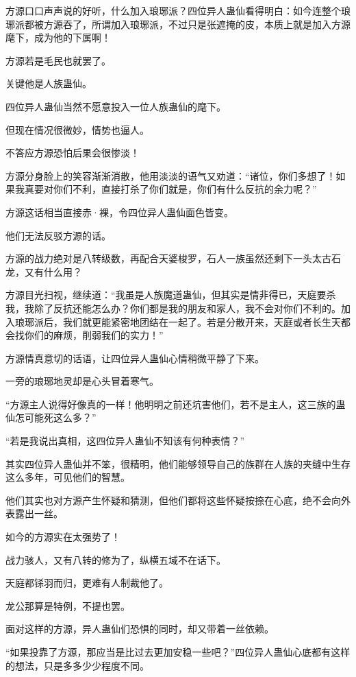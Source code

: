 \begin{this_body}
方源口口声声说的好听，什么加入琅琊派？四位异人蛊仙看得明白：如今连整个琅琊派都被方源吞了，所谓加入琅琊派，不过只是张遮掩的皮，本质上就是加入方源麾下，成为他的下属啊！

方源若是毛民也就罢了。

关键他是人族蛊仙。

四位异人蛊仙当然不愿意投入一位人族蛊仙的麾下。

但现在情况很微妙，情势也逼人。

不答应方源恐怕后果会很惨淡！

方源分身脸上的笑容渐渐消散，他用淡淡的语气又劝道：“诸位，你们多想了！如果我真要对你们不利，直接打杀了你们就是，你们有什么反抗的余力呢？”

方源这话相当直接赤·裸，令四位异人蛊仙面色皆变。

他们无法反驳方源的话。

方源的战力绝对是八转级数，再配合天婆梭罗，石人一族虽然还剩下一头太古石龙，又有什么用？

方源目光扫视，继续道：“我虽是人族魔道蛊仙，但其实是情非得已，天庭要杀我，我除了反抗还能怎么办？你们都是我的朋友和家人，我不会对你们不利的。加入琅琊派后，我们就更能紧密地团结在一起了。若是分散开来，天庭或者长生天都会找你们的麻烦，削弱我们的实力！”

方源情真意切的话语，让四位异人蛊仙心情稍微平静了下来。

一旁的琅琊地灵却是心头冒着寒气。

“方源主人说得好像真的一样！他明明之前还坑害他们，若不是主人，这三族的蛊仙怎可能死这么多？”

“若是我说出真相，这四位异人蛊仙不知该有何种表情？”

其实四位异人蛊仙并不笨，很精明，他们能够领导自己的族群在人族的夹缝中生存这么多年，可见他们的智慧。

他们其实也对方源产生怀疑和猜测，但他们都将这些怀疑按捺在心底，绝不会向外表露出一丝。

如今的方源实在太强势了！

战力骇人，又有八转的修为了，纵横五域不在话下。

天庭都铩羽而归，更难有人制裁他了。

龙公那算是特例，不提也罢。

面对这样的方源，异人蛊仙们恐惧的同时，却又带着一丝依赖。

“如果投靠了方源，那应当是比过去更加安稳一些吧？”四位异人蛊仙心底都有这样的想法，只是多多少少程度不同。


\end{this_body}
